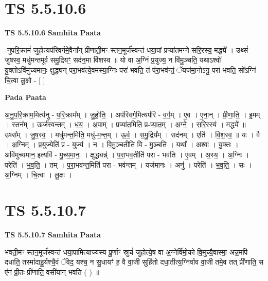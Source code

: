\documentclass[17pt]{extarticle}
\begin{document}

\section{ TS 5.5.10.6 }

\textbf{TS 5.5.10.6 } \newline
\textbf{Samhita Paata} \newline

-नुपरि॒क्रामं॑ जुहो॒त्यप॑रिवर्गमे॒वैना᳚न् प्रीणाती॒मꣳ स्तन॒मूर्ज॑स्वन्तं धया॒पां प्रप्या॑तमग्ने सरि॒रस्य॒ मद्ध्ये᳚ । उथ्सं॑ जुषस्व॒ मधु॑मन्तमूर्व समु॒द्रियꣳ॒॒ सद॑न॒मा वि॑शस्व ॥ यो वा अ॒ग्निं प्र॒युज्य॒ न वि॑मु॒ञ्चति॒ यथाऽश्वो॑ यु॒क्तोऽवि॑मुच्यमानः॒ क्षुद्ध्य॑न् परा॒भव॑त्ये॒वम॑स्या॒ग्निः परा॑ भवति॒ तं प॑रा॒भव॑न्तं॒ ॅयज॑मा॒नोऽनु॒ परा॑ भवति॒ सो᳚ऽग्निं चि॒त्वा लू॒क्षो - [  ] \newline

\textbf{Pada Paata} \newline

अ॒नु॒प॒रि॒क्राम॒मित्य॑नु - प॒रि॒क्राम᳚म् । जु॒हो॒ति॒ । अप॑रिवर्ग॒मित्यप॑रि - व॒र्ग॒म् । ए॒व । ए॒ना॒न् । प्री॒णा॒ति॒ । इ॒मम् । स्तन᳚म् । ऊर्ज॑स्वन्तम् । ध॒य॒ । अ॒पाम् । प्रप्या॑त॒मिति॒ प्र-प्या॒त॒म् । अ॒ग्ने॒ । स॒रि॒रस्य॑ । मद्ध्ये᳚ ॥ उथ्स᳚म् । जु॒ष॒स्व॒ । मधु॑मन्त॒मिति॒ मधु॑-म॒न्त॒म् । ऊ॒र्व॒ । स॒मु॒द्रिय᳚म् । सद॑नम् । एति॑ । वि॒श॒स्व॒ ॥ यः । वै । अ॒ग्निम् । प्र॒युज्येति॑ प्र - युज्य॑ । न । वि॒मु॒ञ्चतीति॑ वि - मु॒ञ्चति॑ । यथा᳚ । अश्वः॑ । यु॒क्तः । अवि॑मुच्यमान॒ इत्यवि॑ - मु॒च्य॒मा॒नः॒ । क्षुद्ध्यन्न्॑ । प॒रा॒भव॒तीति॑ परा - भव॑ति । ए॒वम् । अ॒स्य॒ । अ॒ग्निः । परेति॑ । भ॒व॒ति॒ । तम् । प॒रा॒भव॑न्त॒मिति॑ परा - भव॑न्तम् । यज॑मानः । अनु॑ । परेति॑ । भ॒व॒ति॒ । सः । अ॒ग्निम् । चि॒त्वा । लू॒क्षः ।  \newline





\section{ TS 5.5.10.7 }

\textbf{TS 5.5.10.7 } \newline
\textbf{Samhita Paata} \newline

भ॑वती॒मꣳ स्तन॒मूर्ज॑स्वन्तं धया॒पामित्याज्य॑स्य पू॒र्णाꣳ स्रुचं॑ जुहोत्ये॒ष वा अ॒ग्नेर्वि॑मो॒को वि॒मुच्यै॒वास्मा॒ अन्न॒मपि॑ दधाति॒ तस्मा॑दाहु॒र्यश्चै॒वं ॅवेद॒ यश्च॒ न सु॒धायꣳ॑ ह॒ वै वा॒जी सुहि॑तो दधा॒तीत्य॒ग्निर्वाव वा॒जी तमे॒व तत् प्री॑णाति॒ स ए॑नं प्री॒तः प्री॑णाति॒ वसी॑यान् भवति ( ) ॥ \newline
\end{document}
